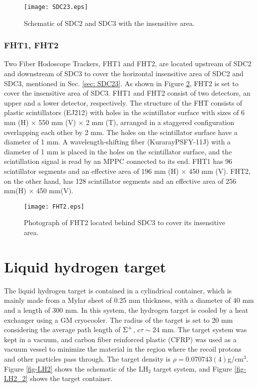 \begin{figure}[!h]
 \begin{center}
   \texttt{[image: SDC23.eps]}
   \caption{Schematic of SDC2 and SDC3 with the insensitive area.}
   \label{fig-SDC23}
 \end{center}
\end{figure}

%
\subsubsection{FHT1, FHT2}
Two Fiber Hodoscope Trackers, FHT1 and FHT2, are located upstream of SDC2 and downstream of SDC3 to cover the horizontal insensitive area of SDC2 and SDC3, mentioned in Sec. \ref{sec: SDC23}. As shown in Figure \ref{fig-FHT2}, FHT2 is set to cover the insensitive area of SDC3.
FHT1 and FHT2 consist of two detectors, an upper and a lower detector, respectively. The structure of the FHT consists of plastic scintillators (EJ212) with holes in the scintillator surface with sizes of 6 mm (H) $\times$ 550 mm (V) $\times$ 2 mm (T), arranged in a staggered configuration overlapping each other by 2 mm. The holes on the scintillator surface have a diameter of 1 mm. A wavelength-shifting fiber (KurarayPSFY-11J) with a diameter of 1 mm is placed in the holes on the scintillator surface, and the scintillation signal is read by an MPPC connected to its end.
FHT1 has 96 scintillator segments and an effective area of 196 mm (H) $\times$ 450 mm (V). FHT2, on the other hand, has 128 scintillator segments and an effective area of 256 mm(H) $\times$ 450 mm(V).

\begin{figure}[!h]
 \begin{center}
   \texttt{[image: FHT2.eps]}
   \caption{Photograph of FHT2 located behind SDC3 to cover its insensitive area.}
   \label{fig-FHT2}
 \end{center}
\end{figure}

\section{Liquid hydrogen target}
The liquid hydrogen target is contained in a cylindrical container, which is mainly made from a Mylar sheet of
0.25 mm thickness, with a diameter of 40 mm and a length of 300 mm. In this system, the hydrogen target is cooled by a heat exchanger using a GM cryocooler. The radius of the target is set to 20 mm considering the average path length of $\Sigma^{+}$, $c\tau\sim 24$ mm. The target system was kept in a vacuum, and carbon fiber reinforced plastic (CFRP) was used as a vacuum vessel to minimize the material in the region where the recoil protons and other particles pass through. The target density is $\rho = 0.070743(4) $g/cm$^{3}$. Figure \ref{fig-LH2} \cite{Nana-D} shows the schematic of the LH$_{2}$ target system, and Figure \ref{fig-LH2_2} \cite{Nana-D} shows the target container.

